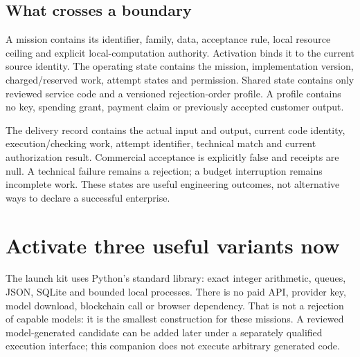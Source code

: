 \documentclass[11pt,letterpaper]{article}
\begin{document}
\subsection{What crosses a boundary}
A mission contains its identifier, family, data, acceptance rule, local resource ceiling and explicit local-computation authority. Activation binds it to the current source identity. The operating state contains the mission, implementation version, charged/reserved work, attempt states and permission. Shared state contains only reviewed service code and a versioned rejection-order profile. A profile contains no key, spending grant, payment claim or previously accepted customer output.

The delivery record contains the actual input and output, current code identity, execution/checking work, attempt identifier, technical match and current authorization result. Commercial acceptance is explicitly false and receipts are null. A technical failure remains a rejection; a budget interruption remains incomplete work. These states are useful engineering outcomes, not alternative ways to declare a successful enterprise.

\section{Activate three useful variants now}
The launch kit uses Python's standard library: exact integer arithmetic, queues, JSON, SQLite and bounded local processes. There is no paid API, provider key, model download, blockchain call or browser dependency. That is not a rejection of capable models: it is the smallest construction for these missions. A reviewed model-generated candidate can be added later under a separately qualified execution interface; this companion does not execute arbitrary generated code.
\end{document}
